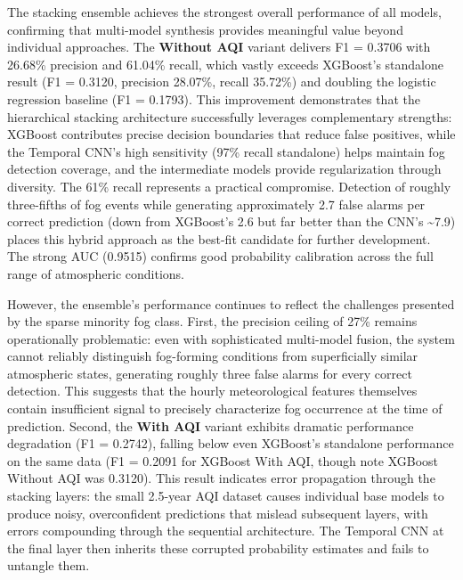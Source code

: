 \documentclass[
  letterpaper,
  DIV=11,
  numbers=noendperiod]{scrartcl}
\begin{document}
The stacking ensemble achieves the strongest overall performance of all
models, confirming that multi-model synthesis provides meaningful value
beyond individual approaches. The \textbf{Without AQI} variant delivers
F1 = 0.3706 with 26.68\% precision and 61.04\% recall, which vastly
exceeds XGBoost's standalone result (F1 = 0.3120, precision 28.07\%,
recall 35.72\%) and doubling the logistic regression baseline (F1 =
0.1793). This improvement demonstrates that the hierarchical stacking
architecture successfully leverages complementary strengths: XGBoost
contributes precise decision boundaries that reduce false positives,
while the Temporal CNN's high sensitivity (97\% recall standalone) helps
maintain fog detection coverage, and the intermediate models provide
regularization through diversity. The 61\% recall represents a practical
compromise. Detection of roughly three-fifths of fog events while
generating approximately 2.7 false alarms per correct prediction (down
from XGBoost's 2.6 but far better than the CNN's \textasciitilde7.9)
places this hybrid approach as the best-fit candidate for further
development. The strong AUC (0.9515) confirms good probability
calibration across the full range of atmospheric conditions.

However, the ensemble's performance continues to reflect the challenges
presented by the sparse minority fog class. First, the precision ceiling
of 27\% remains operationally problematic: even with sophisticated
multi-model fusion, the system cannot reliably distinguish fog-forming
conditions from superficially similar atmospheric states, generating
roughly three false alarms for every correct detection. This suggests
that the hourly meteorological features themselves contain insufficient
signal to precisely characterize fog occurrence at the time of
prediction. Second, the \textbf{With AQI} variant exhibits dramatic
performance degradation (F1 = 0.2742), falling below even XGBoost's
standalone performance on the same data (F1 = 0.2091 for XGBoost With
AQI, though note XGBoost Without AQI was 0.3120). This result indicates
error propagation through the stacking layers: the small 2.5-year AQI
dataset causes individual base models to produce noisy, overconfident
predictions that mislead subsequent layers, with errors compounding
through the sequential architecture. The Temporal CNN at the final layer
then inherits these corrupted probability estimates and fails to
untangle them.
\end{document}
